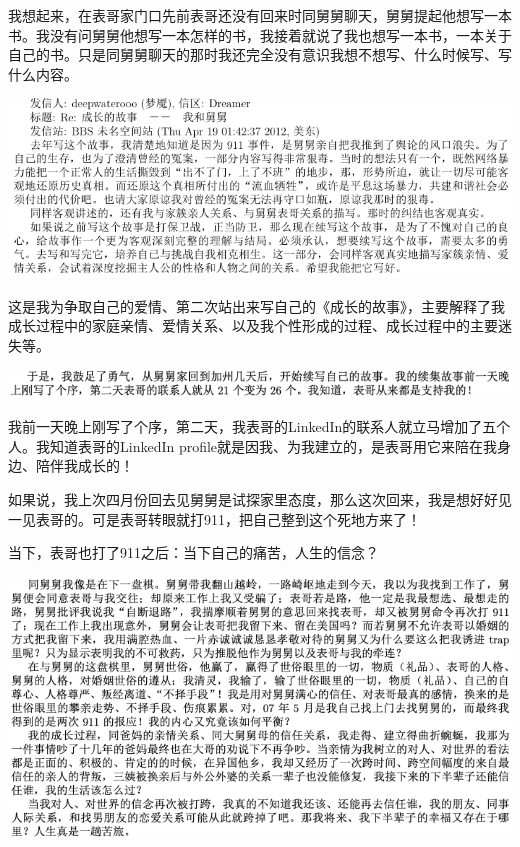 \documentclass[9pt, b5paper]{article}
\begin{document}
我想起来，在表哥家门口先前表哥还没有回来时同舅舅聊天，舅舅提起他想写一本书。我没有问舅舅他想写一本怎样的书，我接着就说了我也想写一本书，一本关于自己的书。只是同舅舅聊天的那时我还完全没有意识我想不想写、什么时候写、写什么内容。 

\begin{center}
\includegraphics[width=.9\linewidth]{./pic/dreamer2.png}
\end{center}

这是我为争取自己的爱情、第二次站出来写自己的《成长的故事》，主要解释了我成长过程中的家庭亲情、爱情关系、以及我个性形成的过程、成长过程中的主要迷失等。 

\begin{center}
\includegraphics[width=.9\linewidth]{./pic/p1p128-2.png}
\end{center}

我前一天晚上刚写了个序，第二天，我表哥的LinkedIn的联系人就立马增加了五个人。我知道表哥的LinkedIn profile就是因我、为我建立的，是表哥用它来陪在我身边、陪伴我成长的！

如果说，我上次四月份回去见舅舅是试探家里态度，那么这次回来，我是想好好见一见表哥的。可是表哥转眼就打911，把自己整到这个死地方来了！

当下，表哥也打了911之后：当下自己的痛苦，人生的信念？

\begin{center}
\includegraphics[width=.9\linewidth]{./pic/p1p135.png}
\end{center}
\end{document}
